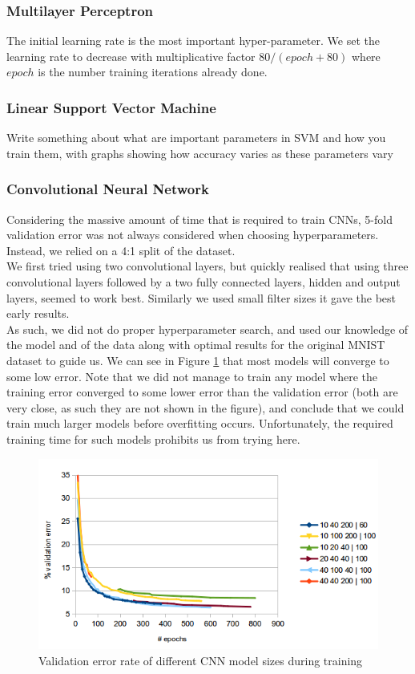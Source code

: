 \documentclass{acm_proc_article-sp}
\begin{document}
\subsubsection{Multilayer Perceptron}
The initial learning rate is the most important hyper-parameter. We set the learning rate to decrease with multiplicative factor $80/(epoch+80)$ where $epoch$ is the number training iterations already done. 



\subsubsection{Linear Support Vector Machine }
Write something about what are important parameters in SVM and how you train them, with graphs showing how accuracy varies as these parameters vary

\subsubsection{Convolutional Neural Network}
Considering the massive amount of time that is required to train CNNs, 5-fold validation error was not always considered when choosing hyperparameters. Instead, we relied on a 4:1 split of the dataset. \\
We first tried using two convolutional layers, but quickly realised that using three convolutional layers followed by a two fully connected layers, hidden and output layers, seemed to work best. Similarly we used small filter sizes it gave the best early results. \\
As such, we did not do proper hyperparameter search, and used our knowledge of the model and of the data along with optimal results for the original MNIST dataset to guide us. We can see in Figure \ref{fig:conv_train} that most models will converge to some low error. Note that we did not manage to train any model where the training error converged to some lower error than the validation error (both are very close, as such they are not shown in the figure), and conclude that we could train much larger models before overfitting occurs. Unfortunately, the required training time for such models prohibits us from trying here.
\begin{figure} 
\centering
\includegraphics[width=0.9\columnwidth]{graphs/conv_train.png}  
\caption{Validation error rate of different CNN model sizes during training}
\label{fig:conv_train}
\end{figure}
\end{document}
